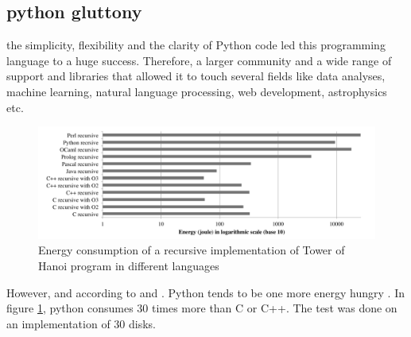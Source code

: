 




\subsection{python gluttony}

the simplicity, flexibility and the clarity of Python code led this programming language to a huge success. Therefore, a larger community and a wide range of support and libraries that allowed it to touch several fields like data analyses, machine learning, natural language processing, web development, astrophysics etc.
\begin{figure}[htbp]
    \includegraphics[width=\linewidth]{imgs/hannoiimplementation.png}
    \caption{Energy consumption of a recursive implementation of Tower of Hanoi program in different languages~\cite{noureddine_preliminary_2012}}
    \label{fig:hannoi}
\end{figure}

However, and according to \cite{pinto_energy_2017} and \cite{noureddine_preliminary_2012}. Python tends to be one more energy hungry . In figure \ref{fig:hannoi}, python consumes 30 times more than C or C++. The test was done on an implementation of   30 disks.

